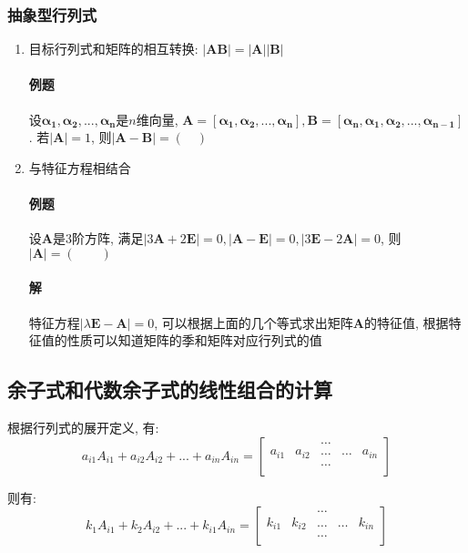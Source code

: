 \subsubsection{抽象型行列式}
\begin{enumerate}
\item 目标行列式和矩阵的相互转换: $|\bm{A}\bm{B}|=|\bm{A}||\bm{B}|$
\paragraph{例题} 设$\bm{\alpha_{1}},\bm{\alpha_{2}},...,\bm{\alpha_{n}}$是$n$维向量, $\bm{A}=[\bm{\alpha_{1}},\bm{\alpha_{2}},...,\bm{\alpha_{n}}],\bm{B}=[\bm{\alpha_{n}},\bm{\alpha_{1}},\bm{\alpha_{2}},...,\bm{\alpha_{n-1}}]$. 若$|\bm{A}|=1$, 则$|\bm{A}-\bm{B}|=(\quad)$\par
\item 与特征方程相结合
\paragraph{例题} 设$\bm{A}$是$ 3 $阶方阵, 满足$ |3 \bm{A}+2 \bm{E}|=0, |\bm{A} - \bm{E}|=0, |3 \bm{E}-2 \bm{A}|=0 $, 则$ |\bm{A}|=(\qquad) $
\paragraph{解} 特征方程$ |\lambda \bm{E}-\bm{A}|=0 $, 可以根据上面的几个等式求出矩阵$ \bm{A} $的特征值, 根据特征值的性质可以知道矩阵的季和矩阵对应行列式的值
\end{enumerate}
\subsection{余子式和代数余子式的线性组合的计算}
根据行列式的展开定义, 有:
\begin{equation*}
a_{i1}A_{i1}+a_{i2}A_{i2}+...+a_{in}A_{in}=
\begin{bmatrix}
&  & \dots &  & \\
a_{i1} & a_{i2} & \dots & \dots & a_{in} \\
&  & \dots &  & \\
\end{bmatrix}
\end{equation*}\par
则有:
\begin{equation*}
k_{1}A_{i1}+k_{2}A_{i2}+...+k_{i1}A_{in}=
\begin{bmatrix}
&  & \dots &  & \\
k_{i1} & k_{i2} & \dots & \dots & k_{in} \\
&  & \dots &  & \\
\end{bmatrix}
\end{equation*}\par
